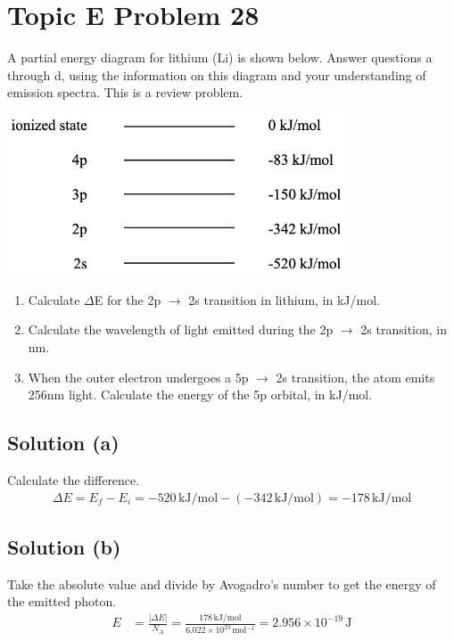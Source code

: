 \documentclass[10pt]{article}
\newcommand{\E}[1]{\times 10^{#1}}
\begin{document}
    \pagebreak
    \section{Topic E Problem 28}
        A partial energy diagram for lithium (Li) is shown below. 
        Answer questions a through d, using the information on this diagram and your understanding of emission spectra. 
        This is a review problem.
        \begin{center}
            \includegraphics[width=0.75\textwidth]{img-E28.png}
        \end{center}

        \begin{enumerate}[label=\alph*)]
            \item   Calculate $\Delta$E for the 2p $\rightarrow$ 2s transition in lithium, in kJ/mol.
            \item   Calculate the wavelength of light emitted during the 2p $\rightarrow$ 2s transition, in nm.
            \item   When the outer electron undergoes a 5p $\rightarrow$ 2s transition, the atom emits 256nm light. Calculate the energy of the 5p orbital, in kJ/mol.
        \end{enumerate}

        \subsection{Solution (a)}
            Calculate the difference.
            \begin{gather}
                \Delta E    =   E_f - E_i
                    =   -520\,\unit{\kilo\joule/\mole} - (-342\,\unit{\kilo\joule/\mole})
                    =   \boxed{-178\,\unit{\kilo\joule/\mole}}
            \end{gather}

        \subsection{Solution (b)}
            Take the absolute value and divide by Avogadro's number to get the energy of the emitted photon.
            \begin{align}
                E   &=  \frac{\left| \Delta E \right|}{N_A}
                    =   \frac{178\,\unit{\kilo\joule/\mole}}{6.022\E{23}\,\unit{\mole^{-1}}}
                    =   2.956\E{-19}\,\unit{\joule}
            \end{align} 
\end{document}
